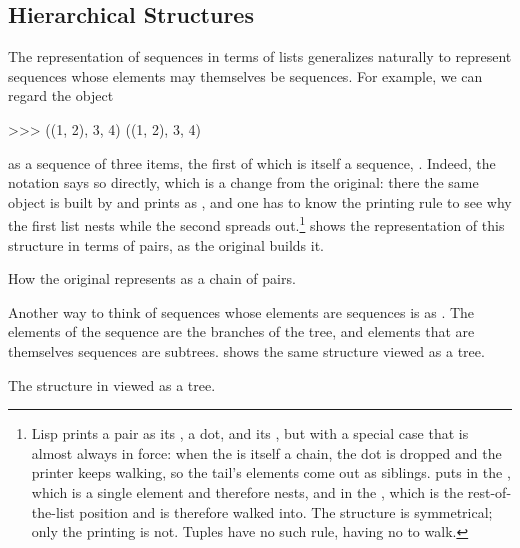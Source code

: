 \subsection{Hierarchical Structures}
\label{Section 2.2.2}

The representation of sequences in terms of lists generalizes naturally to
represent sequences whose elements may themselves be sequences.  For example,
we can regard the object

\begin{codeBlock}
>>> ((1, 2), 3, 4)
((1, 2), 3, 4)
\end{codeBlock}

\noindent
as a sequence of three items, the first of which is itself a sequence,
.  Indeed, the notation says so directly, which is a change from
the original: there the same object is built by  and prints as , and one has to know the printing rule to
see why the first list nests while the second spreads out.\footnote{Lisp prints
a pair as its , a dot, and its , but with a special case
that is almost always in force: when the  is itself a chain, the dot
is dropped and the printer keeps walking, so the tail's elements come out as
siblings.   puts  in the , which is a single
element and therefore nests, and  in the , which is the
rest-of-the-list position and is therefore walked into.  The structure is
symmetrical; only the printing is not.  Tuples have no such rule, having no
 to walk.}  shows the representation of this
structure in terms of pairs, as the original builds it.

\begin{imageFigure}{How the original represents  as a
  chain of pairs.}
  
\end{imageFigure}

Another way to think of sequences whose elements are sequences is as
.  The elements of the sequence are the branches of the tree,
and elements that are themselves sequences are subtrees.  
shows the same structure viewed as a tree.

\begin{imageFigure}{The structure in  viewed as a tree.}
  
\end{imageFigure}

